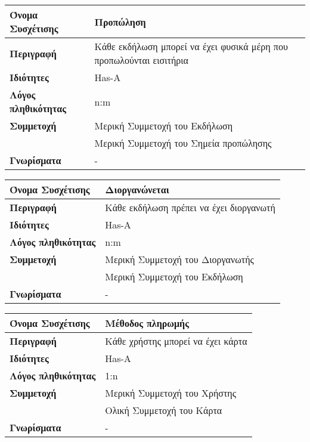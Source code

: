 \begin{center}
\begin{tabular}[]{|p{4cm}|p{10cm}|}
  \hline
  \textbf{Όνομα Συσχέτισης} & Προπώληση \\ \hline
  \textbf{Περιγραφή} & Κάθε εκδήλωση μπορεί να έχει φυσικά μέρη που προπωλούνται εισιτήρια\\ \hline
  \textbf{Ιδιότητες} & Has-A \\ \hline
  \textbf{Λόγος πληθικότητας} & n:m \\ \hline
  \textbf{Συμμετοχή} & Μερική Συμμετοχή του Εκδήλωση \\ \cline{2-2}
                     & Μερική Συμμετοχή του Σημεία προπώλησης\\ \hline
  \textbf{Γνωρίσματα} & - \\ \hline
\end{tabular}
\vspace{0.3 cm}


\begin{tabular}[]{|p{4cm}|p{10cm}|}
  \hline
  \textbf{Όνομα Συσχέτισης} & Διοργανώνεται\\  \hline
  \textbf{Περιγραφή} & Κάθε εκδήλωση πρέπει να έχει διοργανωτή\\ \hline
  \textbf{Ιδιότητες} & Has-A \\ \hline
  \textbf{Λόγος πληθικότητας} & n:m \\ \hline
  \textbf{Συμμετοχή} & Mερική Συμμετοχή του Διοργανωτής \\ \cline{2-2}
                     & Μερική Συμμετοχή του Εκδήλωση \\ \hline
  \textbf{Γνωρίσματα} & - \\ \hline
\end{tabular}
\vspace{0.3 cm}

\begin{tabular}[]{|p{4cm}|p{10cm}|}
  \hline
  \textbf{Όνομα Συσχέτισης} & Μέθοδος πληρωμής\\  \hline
  \textbf{Περιγραφή} & Κάθε χρήστης μπορεί να έχει κάρτα\\ \hline
  \textbf{Ιδιότητες} & Has-A \\ \hline
  \textbf{Λόγος πληθικότητας} & 1:n \\ \hline
  \textbf{Συμμετοχή} & Mερική Συμμετοχή του Χρήστης \\ \cline{2-2}
                     & Ολική Συμμετοχή του Κάρτα \\ \hline
  \textbf{Γνωρίσματα} & - \\ \hline
\end{tabular}
\vspace{0.3 cm}



\end{center}
